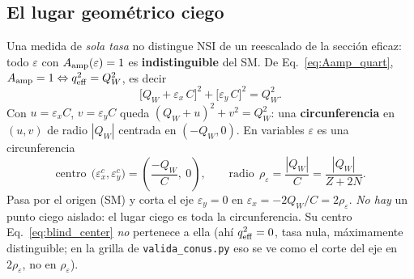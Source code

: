 \documentclass[11pt,a4paper]{article}
\newcommand{\eps}{\varepsilon}
\newcommand{\QW}{Q_{W}}
\newcommand{\qeff}{q_{\rm eff}}
\newcommand{\Aamp}{A_{\rm amp}}
\newcommand{\code}[1]{\texttt{#1}}
\begin{document}
\subsection{El lugar geom\'etrico ciego}
\label{sec:blind}

Una medida de \emph{sola tasa} no distingue NSI de un reescalado de la secci\'on
eficaz: todo $\eps$ con $\Aamp(\eps)=1$ es \textbf{indistinguible} del SM. De
Eq.~\eqref{eq:Aamp_quart}, $\Aamp=1 \Leftrightarrow \qeff^{2}=\QW^{2}$, es decir
\begin{equation}
  \label{eq:blind_conic}
  \bigl[\QW + \eps_{x}\,C\bigr]^{2} + \bigl[\eps_{y}\,C\bigr]^{2} = \QW^{2}.
\end{equation}
Con $u=\eps_{x}C$, $v=\eps_{y}C$ queda $(\QW+u)^{2}+v^{2}=\QW^{2}$: una
\textbf{circunferencia} en $(u,v)$ de radio $|\QW|$ centrada en $(-\QW,0)$. En
variables $\eps$ es una circunferencia
\begin{equation}
  \label{eq:blind_center}
  \text{centro}\ \ \bigl(\eps_{x}^{c},\eps_{y}^{c}\bigr)
  = \left(\frac{-\QW}{C},\ 0\right),
  \qquad
  \text{radio}\ \ \rho_{\eps} = \frac{|\QW|}{C} = \frac{|\QW|}{Z+2N}.
\end{equation}
Pasa por el origen (SM) y corta el eje $\eps_{y}=0$ en $\eps_{x}=-2\QW/C
=2\rho_{\eps}$. \emph{No hay} un punto ciego aislado: el lugar ciego es toda la
circunferencia. Su centro Eq.~\eqref{eq:blind_center} \emph{no} pertenece a ella
(ah\'i $\qeff^{2}=0$, tasa nula, m\'aximamente distinguible; en la grilla de
\code{valida\_conus.py} eso se ve como el corte del eje en $2\rho_{\eps}$, no en
$\rho_{\eps}$).
\end{document}
